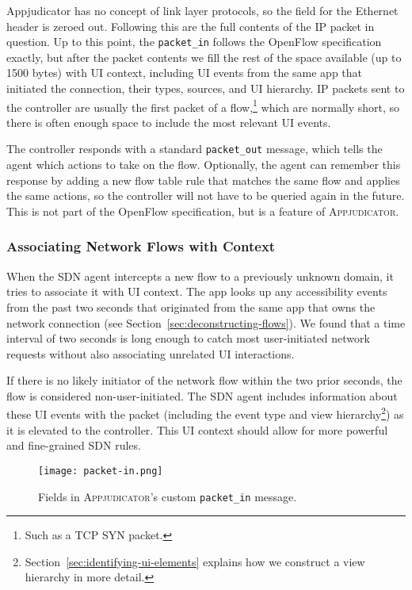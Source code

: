 Appjudicator has no concept of link layer protocols, so the field for the
Ethernet header is zeroed out. Following this are the full contents of the IP
packet in question. Up to this point, the \texttt{packet\_in} follows the
OpenFlow specification exactly, but after the packet contents we fill the rest
of the space available (up to 1500 bytes) with UI context, including UI events
from the same app that initiated the connection, their types, sources, and UI
hierarchy. IP packets sent to the controller are usually the first packet of
a flow,\footnote{Such as a TCP SYN packet.} which are normally short, so
there is often enough space to include the most relevant UI events.

The controller responds with a standard \texttt{packet\_out} message, which
tells the agent which actions to take on the flow. Optionally, the agent can
remember this response by adding a new flow table rule that matches the same
flow and applies the same actions, so the controller will not have to be queried
again in the future. This is not part of the OpenFlow specification, but is a
feature of \textsc{Appjudicator}.

\subsubsection{Associating Network Flows with Context}
\label{sec:associating-network-flows-with-context}

When the SDN agent intercepts a new flow to a previously unknown domain, it
tries to associate it with UI context. The app  looks up any accessibility events
from the past two seconds that originated from the same app that owns the
network connection (see Section~\ref{sec:deconstructing-flows}). We found that a
time interval of two seconds is long enough to catch most user-initiated network
requests without also associating unrelated UI interactions.

If there is no likely initiator of the network flow within the two prior
seconds, the flow is considered non-user-initiated. The SDN agent includes
information about these UI events with the packet (including the event type and
view hierarchy\footnote{Section~\ref{sec:identifying-ui-elements} explains how
	we construct a view hierarchy in more detail.}) as it is elevated to the
controller. This UI context should allow for more powerful and fine-grained SDN
rules.

\begin{figure}[h]
	\centering
	\texttt{[image: packet-in.png]}
	\caption{Fields in \textsc{Appjudicator}'s custom \texttt{packet\_in}
		message.}
    \label{fig:packet-in}
\end{figure}

